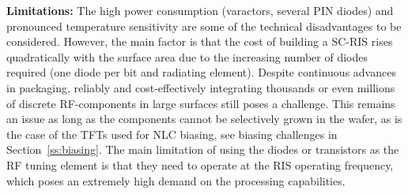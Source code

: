 {\bf Limitations:} The high power consumption (varactors, several PIN diodes) and pronounced temperature sensitivity are some of the technical disadvantages to be considered. 
However, the main factor is that the cost of building a \gls{SC}-\gls{RIS} rises quadratically with the surface area due to the increasing number of diodes required (one diode per bit and radiating element). 
Despite continuous advances in packaging, reliably and cost-effectively integrating thousands or even millions of discrete \gls{RF}-components in large surfaces still poses a challenge.
This remains an issue as long as the components cannot be selectively grown in the wafer, as is the case of the \glspl{TFT} used for \gls{NLC} biasing, see biasing challenges in Section~\ref{ss:biasing}.
The main limitation of using the diodes or transistors as the \gls{RF} tuning element is that they need to operate at the \gls{RIS} operating frequency, %
which poses an extremely high demand on the processing capabilities.











